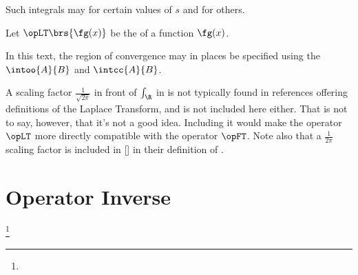 Such integrals may  for certain values of $s$ and  for others.
\begin{definition}
\label{def:roc}
Let $\opLT\brs{\fg(x)}$ be the   of a function $\fg(x)$.
\end{definition}

In this text, the region of convergence may in places be specified using
the  $\intoo{A}{B}$ and 
$\intcc{A}{B}$.

\begin{remark}
A scaling factor $\frac{1}{\sqrt{2\pi}}$ in front of $\int_\R$ in 
is not typically found in references offering
definitions of the Laplace Transform, and is not included here either.
That is not to say, however, that it's not a good idea.
Including it would make the operator $\opLT$ more directly compatible
with the  operator $\opFT$.
Note also that a $\frac{1}{2\pi}$ scaling factor is included in
[] in their definition of 
.
\end{remark}

\section{Operator Inverse}
\begin{theorem}
\footnote{
  }
\label{thm:opLTi}
\end{theorem}

